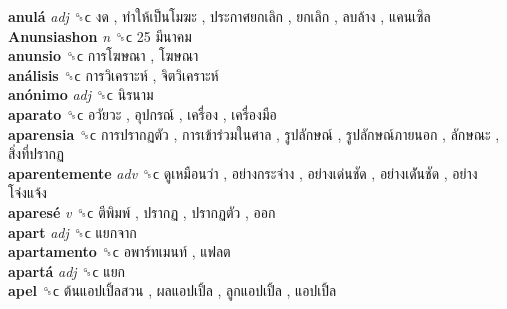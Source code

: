 \textbf{anulá} \emph{adj}  ␝ϲ   งด ,  ทำให้เป็นโมฆะ ,  ประกาศยกเลิก ,  ยกเลิก ,  ลบล้าง ,  แคนเซิล   \\
\textbf{Anunsiashon} \emph{n}  ␝ϲ   25 มีนาคม   \\
\textbf{anunsio} ␝ϲ   การโฆษณา ,  โฆษณา   \\
\textbf{análisis} ␝ϲ   การวิเคราะห์ ,  จิตวิเคราะห์   \\
\textbf{anónimo} \emph{adj}  ␝ϲ   นิรนาม   \\
\textbf{aparato} ␝ϲ   อวัยวะ ,  อุปกรณ์ ,  เครื่อง ,  เครื่องมือ   \\
\textbf{aparensia} ␝ϲ   การปรากฏตัว ,  การเข้าร่วมในศาล ,  รูปลักษณ์ ,  รูปลักษณ์ภายนอก ,  ลักษณะ ,  สิ่งที่ปรากฏ   \\
\textbf{aparentemente} \emph{adv}  ␝ϲ   ดูเหมือนว่า ,  อย่างกระจ่าง ,  อย่างเด่นชัด ,  อย่างเด่ันชัด ,  อย่างโจ่งแจ้ง   \\
\textbf{aparesé} \emph{v}  ␝ϲ   ตีพิมพ์ ,  ปรากฏ ,  ปรากฏตัว ,  ออก   \\
\textbf{apart} \emph{adj}  ␝ϲ   แยกจาก   \\
\textbf{apartamento} ␝ϲ   อพาร์ทเมนท์ ,  แฟลต   \\
\textbf{apartá} \emph{adj}  ␝ϲ   แยก   \\
\textbf{apel} ␝ϲ   ต้นแอปเปิ้ลสวน ,  ผลแอปเปิ้ล ,  ลูกแอปเปิ้ล ,  แอปเปิ้ล   \\
